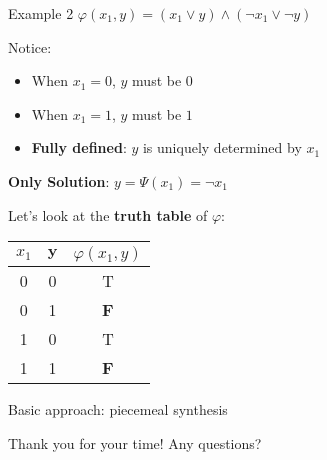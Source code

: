 \documentclass[aspectratio=169]{beamer}
\begin{document}
\begin{frame}{Example 2}
$\varphi(x_1, y) = (x_1 \lor y) \land (\neg x_1 \lor \neg y)$
\bigskip

Notice:
\begin{itemize}
    \item When $x_1 = 0$, $y$ must be $0$
    \item When $x_1 = 1$, $y$ must be $1$
    \item \textbf{Fully defined}: $y$ is uniquely determined by $x_1$
\end{itemize}
\bigskip

\textbf{Only Solution}: $y = \Psi(x_1) = \neg x_1$
\bigskip

Let's look at the \textbf{truth table} of \(\varphi\):
\begin{tabular}{|c|c|c|}
    \hline
    $x_1$ & $\mathbf{y}$ & $\varphi(x_1, y)$ \\
    \hline
    0 & 0 & T\\
    0 & 1 & \textbf{F}\\
    1 & 0 & T\\
    1 & 1 & \textbf{F}\\
    \hline
\end{tabular}
\end{frame}

\begin{frame}{Basic approach: piecemeal synthesis}
\end{frame}

\begin{frame}{Thank you for your time!}
    Any questions?
\end{frame}
\end{document}
